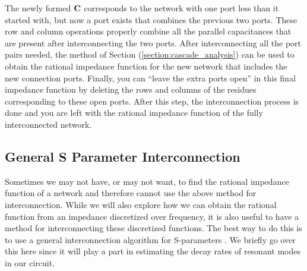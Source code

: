 The newly formed $\vb{C}$ corresponds to the network with one port less than it started with, but now a port exists that combines the previous two ports. These row and column operations properly combine all the parallel capacitances that are present after interconnecting the two ports. After interconnecting all the port pairs needed, the method of Section (\ref{section:cascade_analysis}) can be used to obtain the rational impedance function for the new network that includes the new connection ports. Finally, you can ``leave the extra ports open'' in this final impedance function by deleting the rows and columns of the residues corresponding to these open ports. After this step, the interconnection process is done and you are left with the rational impedance function of the fully interconnected network.

\subsection{General S Parameter Interconnection}\label{section:s_interconnection}

Sometimes we may not have, or may not want, to find the rational impedance function of a network and therefore cannot use the above method for interconnection. While we will also explore how we can obtain the rational function from an impedance discretized over frequency, it is also useful to have a method for interconnecting these discretized functions. The best way to do this is to use a general interconnection algorithm for S-parameters \cite{filipsson_new_1981,subnetwork_growth}. We briefly go over this here since it will play a part in estimating the decay rates of resonant modes in our circuit.

